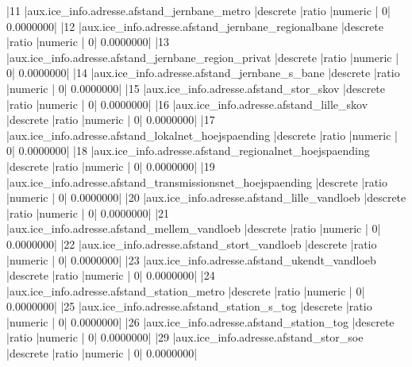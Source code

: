 \documentclass{report}
\begin{document}
\begin{Schunk}
\begin{Soutput}
|11  |aux.ice_info.adresse.afstand_jernbane_metro                   |descrete           |ratio          |numeric         |              0|          0.0000000|
|12  |aux.ice_info.adresse.afstand_jernbane_regionalbane            |descrete           |ratio          |numeric         |              0|          0.0000000|
|13  |aux.ice_info.adresse.afstand_jernbane_region_privat           |descrete           |ratio          |numeric         |              0|          0.0000000|
|14  |aux.ice_info.adresse.afstand_jernbane_s_bane                  |descrete           |ratio          |numeric         |              0|          0.0000000|
|15  |aux.ice_info.adresse.afstand_stor_skov                        |descrete           |ratio          |numeric         |              0|          0.0000000|
|16  |aux.ice_info.adresse.afstand_lille_skov                       |descrete           |ratio          |numeric         |              0|          0.0000000|
|17  |aux.ice_info.adresse.afstand_lokalnet_hoejspaending           |descrete           |ratio          |numeric         |              0|          0.0000000|
|18  |aux.ice_info.adresse.afstand_regionalnet_hoejspaending        |descrete           |ratio          |numeric         |              0|          0.0000000|
|19  |aux.ice_info.adresse.afstand_transmissionsnet_hoejspaending   |descrete           |ratio          |numeric         |              0|          0.0000000|
|20  |aux.ice_info.adresse.afstand_lille_vandloeb                   |descrete           |ratio          |numeric         |              0|          0.0000000|
|21  |aux.ice_info.adresse.afstand_mellem_vandloeb                  |descrete           |ratio          |numeric         |              0|          0.0000000|
|22  |aux.ice_info.adresse.afstand_stort_vandloeb                   |descrete           |ratio          |numeric         |              0|          0.0000000|
|23  |aux.ice_info.adresse.afstand_ukendt_vandloeb                  |descrete           |ratio          |numeric         |              0|          0.0000000|
|24  |aux.ice_info.adresse.afstand_station_metro                    |descrete           |ratio          |numeric         |              0|          0.0000000|
|25  |aux.ice_info.adresse.afstand_station_s_tog                    |descrete           |ratio          |numeric         |              0|          0.0000000|
|26  |aux.ice_info.adresse.afstand_station_tog                      |descrete           |ratio          |numeric         |              0|          0.0000000|
|29  |aux.ice_info.adresse.afstand_stor_soe                         |descrete           |ratio          |numeric         |              0|          0.0000000|

\end{Soutput}
\end{Schunk}
\end{document}
